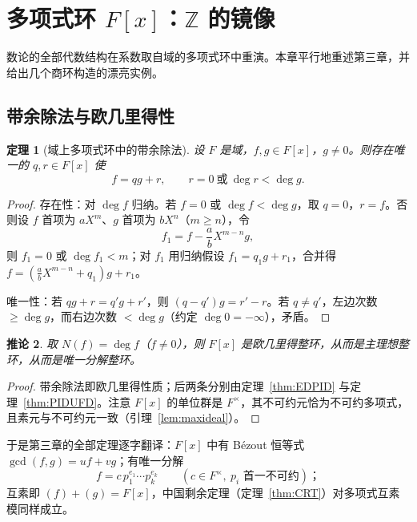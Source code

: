 \documentclass[a4paper,11pt]{ctexart}
\numberwithin{equation}{section}
\theoremstyle{plain}
\newtheorem{theorem}{定理}[section]
\newtheorem{corollary}[theorem]{推论}
\theoremstyle{definition}
\theoremstyle{remark}
\newcommand{\Z}{\mathbb{Z}}
\begin{document}
\newpage

\section{多项式环 $F[x]$：$\Z$ 的镜像}\label{sec:Fx}

数论的全部代数结构在系数取自域的多项式环中重演。本章平行地重述第三章，并给出几个商环构造的漂亮实例。

\subsection{带余除法与欧几里得性}

\begin{theorem}[域上多项式环中的带余除法]\label{thm:divFx}
设 $F$ 是域，$f,g\in F[x]$，$g\neq0$。则存在唯一的 $q,r\in F[x]$ 使
\[
f=qg+r,\qquad r=0\ \text{或}\ \deg r<\deg g .
\]
\end{theorem}

\begin{proof}
存在性：对 $\deg f$ 归纳。若 $f=0$ 或 $\deg f<\deg g$，取 $q=0$，$r=f$。否则设 $f$ 首项为 $aX^m$、$g$ 首项为 $bX^n$（$m\ge n$），令
\[
f_1=f-\frac ab X^{m-n}g ,
\]
则 $f_1=0$ 或 $\deg f_1<m$；对 $f_1$ 用归纳假设 $f_1=q_1g+r_1$，合并得 $f=(\frac abX^{m-n}+q_1)g+r_1$。

唯一性：若 $qg+r=q'g+r'$，则 $(q-q')g=r'-r$。若 $q\neq q'$，左边次数 $\ge\deg g$，而右边次数 $<\deg g$（约定 $\deg 0=-\infty$），矛盾。
\end{proof}

\begin{corollary}\label{cor:FxED}
取 $N(f)=\deg f$（$f\neq0$），则 $F[x]$ 是欧几里得整环，从而是主理想整环，从而是唯一分解整环。
\end{corollary}

\begin{proof}
带余除法即欧几里得性质；后两条分别由定理~\ref{thm:EDPID} 与定理~\ref{thm:PIDUFD}。注意 $F[x]$ 的单位群是 $F^{\times}$，其不可约元恰为不可约多项式，且素元与不可约元一致（引理~\ref{lem:maxideal}）。
\end{proof}

于是第三章的全部定理逐字翻译：$F[x]$ 中有 Bézout 恒等式 $\gcd(f,g)=uf+vg$；有唯一分解
\[
f=c\,p_1^{e_1}\cdots p_k^{e_k}\qquad (c\in F^{\times},\ p_i \text{ 首一不可约})；
\]
互素即 $(f)+(g)=F[x]$，中国剩余定理（定理~\ref{thm:CRT}）对多项式互素模同样成立。
\end{document}
